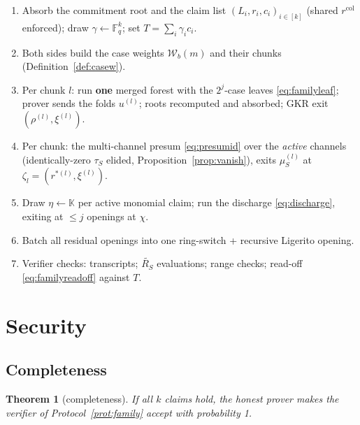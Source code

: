 \documentclass[11pt]{article}
\newcommand{\F}{\mathbb{F}}
\newcommand{\K}{\mathbb{K}}            %
\newcommand{\Fq}{\F_q}                 %
\newcommand{\mle}[1]{\widetilde{#1}}
\newcommand{\Wc}{\mathcal{W}}          %
\theoremstyle{plain}
\newtheorem{theorem}{Theorem}[section]
\theoremstyle{definition}
\theoremstyle{remark}
\begin{document}
\begin{protocol}\label{prot:family}
\leavevmode
\begin{enumerate}[leftmargin=1.7em,itemsep=1.5pt]
\item Absorb the commitment root and the claim list $(L_i,r_i,c_i)_{i\in[k]}$
  (shared $r^{\mathrm{col}}$ enforced); draw $\gamma\gets\Fq^{k}$; set
  $T=\sum_i\gamma_ic_i$.
\item Both sides build the case weights $\Wc_b(m)$ and their chunks
  (Definition~\ref{def:casew}).
\item Per chunk $l$: run \textbf{one} merged forest with the
  $2^{j}$-case leaves \eqref{eq:familyleaf}; prover sends the folds
  $u^{(l)}$; roots recomputed and absorbed; GKR exit
  $(\rho^{(l)},\xi^{(l)})$.
\item Per chunk: the multi-channel presum \eqref{eq:presumid} over the
  \emph{active} channels (identically-zero $\tau_S$ elided,
  Proposition~\ref{prop:vanish}), exits
  $\mu^{(l)}_S$ at $\zeta_l=(r^{*(l)},\xi^{(l)})$.
\item Draw $\eta\gets\K$ per active monomial claim; run the discharge
  \eqref{eq:discharge}, exiting at $\le j$ openings at $\chi$.
\item Batch all residual openings into one ring-switch + recursive Ligerito
  opening.
\item Verifier checks: transcripts; $\mle{R_S}$ evaluations; range checks;
  read-off \eqref{eq:familyreadoff} against $T$.
\end{enumerate}
\end{protocol}

\section{Security}\label{sec:security}

\subsection{Completeness}

\begin{theorem}[completeness]\label{thm:complete}
If all $k$ claims hold, the honest prover makes the verifier of
Protocol~\ref{prot:family} accept with probability 1.
\end{theorem}
\end{document}
